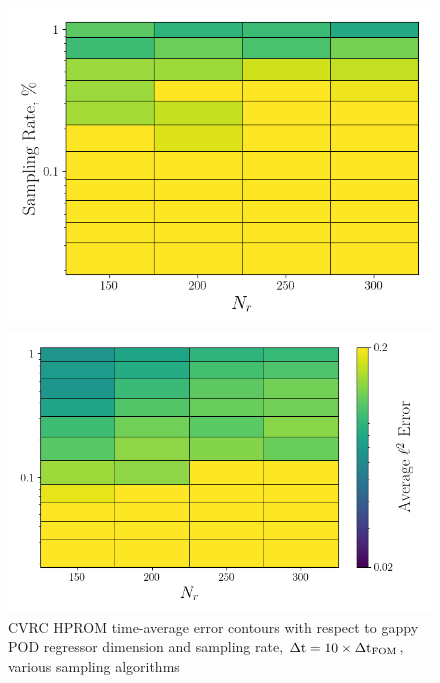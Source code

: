 \begin{figure}
	\begin{minipage}{0.46\linewidth}
		\includegraphics[width=0.99\linewidth]{Chapters/HPROMResults/Images/cvrc/deim/err_contour_gnat1_dt1e-6.png}
	\end{minipage}
	\begin{minipage}{0.53\linewidth}
		\includegraphics[width=0.99\linewidth]{Chapters/HPROMResults/Images/cvrc/deim/err_contour_gnat2_dt1e-6.png}
	\end{minipage}
	\caption{\label{fig:cvrcSampledROMErrContourDt1e-6}CVRC HPROM time-average error contours with respect to gappy POD regressor dimension and sampling rate, $\Delta \text{t} = 10 \times \Delta \text{t}_{\text{FOM}}$, various sampling algorithms}
\end{figure}

